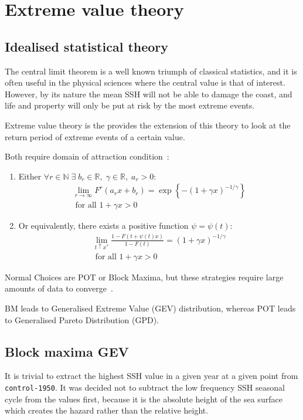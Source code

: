 \section{Extreme value theory}
\label{sec:5_Transform}
\subsection{Idealised statistical theory}
The central limit theorem is a well known triumph of classical statistics,
and it is often useful in the physical sciences where the central value
is that of interest. However, by its nature the mean SSH will
not be able to damage the coast, and life and property will only be put
at risk by the most extreme events.

Extreme value theory is the provides the extension of this theory
to look at the return period of extreme events of a certain value.

Both require domain of attraction condition~\cite{bucher2018horse}:

\begin{enumerate}
  \item Either $\forall r \in \mathbb{N} \;\exists \;b_r \in \mathbb{R},\; \gamma\in \mathbb{R},\; a_r>0: $
    \begin{eqnarray}
    \lim _{r \rightarrow \infty} F^{r}\left(a_{r} x+b_{r}\right)=\exp \left\{-(1+\gamma x)^{-1 / \gamma}\right\} \\
     \text { for all } 1+\gamma x>0
    \tag{BM}
    \end{eqnarray}

  \item Or equivalently, there exists a positive function $\psi=\psi (t):$
    \begin{eqnarray}
    \lim _{t \uparrow x^{*}} \frac{1-F(t+\psi(t) x)}{1-F(t)}=(1+\gamma x)^{-1 / \gamma} \\
    \text { for all } 1+\gamma x>0
    \tag{POT}
    \end{eqnarray}
 \end{enumerate}

Normal Choices are POT or Block Maxima, but these strategies require
large amounts of data to converge~\cite{taleb2019much}.

BM leads to Generalised Extreme Value (GEV) distribution,
      whereas POT leads to Generalised Pareto Distribution (GPD).

\subsection{Block maxima GEV}
It is trivial to extract the highest SSH value in a given year at a given point
from \texttt{control-1950}.
It was decided not to subtract the low frequency SSH seasonal cycle from the
values first, because it is the absolute height of the sea surface which
creates the hazard rather than the relative height.

